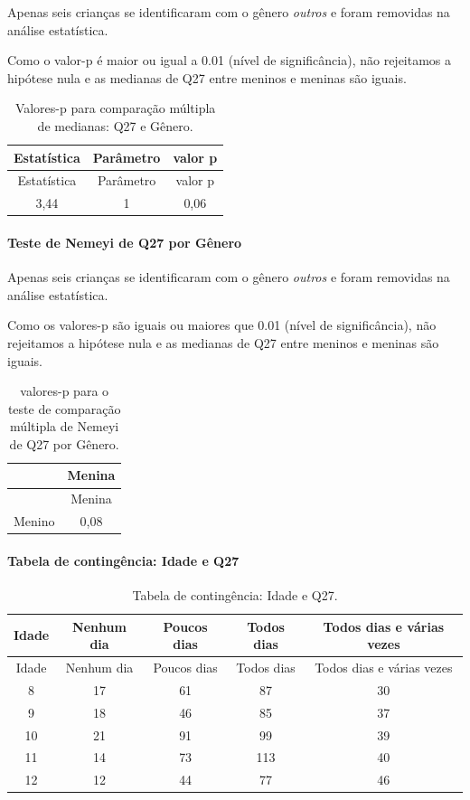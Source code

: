 \documentclass[]{article}
\let\oldparagraph\paragraph
\renewcommand{\paragraph}[1]{\oldparagraph{#1}\mbox{}}
\begin{document}
Apenas seis crianças se identificaram com o gênero \emph{outros} e foram removidas na análise estatística.

Como o valor-p é maior ou igual a 0.01 (nível de significância), não rejeitamos a hipótese nula e as medianas de Q27 entre meninos e meninas são iguais.

\begin{longtable}[]{@{}ccc@{}}
\caption{\label{tab:unnamed-chunk-796}Valores-p para comparação múltipla de medianas: Q27 e Gênero.}\tabularnewline
\toprule
Estatística & Parâmetro & valor p\tabularnewline
\midrule
\endfirsthead
\toprule
Estatística & Parâmetro & valor p\tabularnewline
\midrule
\endhead
3,44 & 1 & 0,06\tabularnewline
\bottomrule
\end{longtable}

\hypertarget{teste-de-nemeyi-de-q27-por-guxeanero}{%
\paragraph{Teste de Nemeyi de Q27 por Gênero}\label{teste-de-nemeyi-de-q27-por-guxeanero}}

Apenas seis crianças se identificaram com o gênero \emph{outros} e foram removidas na análise estatística.

Como os valores-p são iguais ou maiores que 0.01 (nível de significância), não rejeitamos a hipótese nula e as medianas de Q27 entre meninos e meninas são iguais.

\begin{longtable}[]{@{}lc@{}}
\caption{\label{tab:unnamed-chunk-798}valores-p para o teste de comparação múltipla de Nemeyi de Q27 por Gênero.}\tabularnewline
\toprule
& Menina\tabularnewline
\midrule
\endfirsthead
\toprule
& Menina\tabularnewline
\midrule
\endhead
Menino & 0,08\tabularnewline
\bottomrule
\end{longtable}

\cleardoublepage

\hypertarget{tabela-de-continguxeancia-idade-e-q27}{%
\paragraph{Tabela de contingência: Idade e Q27}\label{tabela-de-continguxeancia-idade-e-q27}}

\begin{longtable}[]{@{}ccccc@{}}
\caption{\label{tab:unnamed-chunk-799}Tabela de contingência: Idade e Q27.}\tabularnewline
\toprule
Idade & Nenhum dia & Poucos dias & Todos dias & Todos dias e várias vezes\tabularnewline
\midrule
\endfirsthead
\toprule
Idade & Nenhum dia & Poucos dias & Todos dias & Todos dias e várias vezes\tabularnewline
\midrule
\endhead
8 & 17 & 61 & 87 & 30\tabularnewline
9 & 18 & 46 & 85 & 37\tabularnewline
10 & 21 & 91 & 99 & 39\tabularnewline
11 & 14 & 73 & 113 & 40\tabularnewline
12 & 12 & 44 & 77 & 46\tabularnewline
\bottomrule
\end{longtable}
\end{document}
